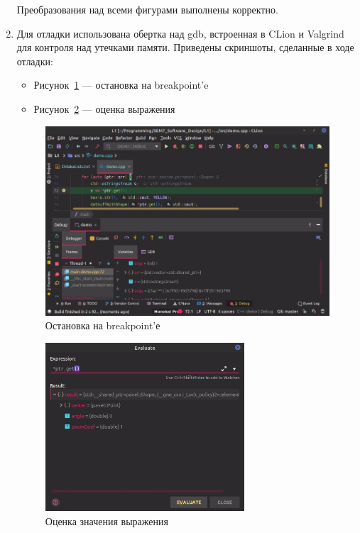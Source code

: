 \documentclass[a4paper, 14pt]{extarticle}
\begin{document}
\begin{enumerate}
    Преобразования над всеми фигурами выполнены корректно.

    \item Для отладки использована обертка над gdb, встроенная в CLion и Valgrind для контроля над утечками памяти.
    Приведены скриншоты, сделанные в ходе отладки:
    \begin{itemize}
        \item Рисунок~\ref{img:shapes:breakpoint} --- остановка на breakpoint'e
        \item Рисунок~\ref{img:shapes:eval} --- оценка выражения
    \end{itemize}

    \begin{figure}[h]
        \centering
        \includegraphics[width=\textwidth]{./img/S003.jpg}
        \caption{Остановка на breakpoint'е}%
        \label{img:shapes:breakpoint}
    \end{figure}
    \begin{figure}[h]
        \centering
        \includegraphics[width=0.7\textwidth]{./img/S004.jpg}
        \caption{Оценка значения выражения}%
        \label{img:shapes:eval}
    \end{figure}
    
    
    
    
\end{enumerate}
\end{document}
